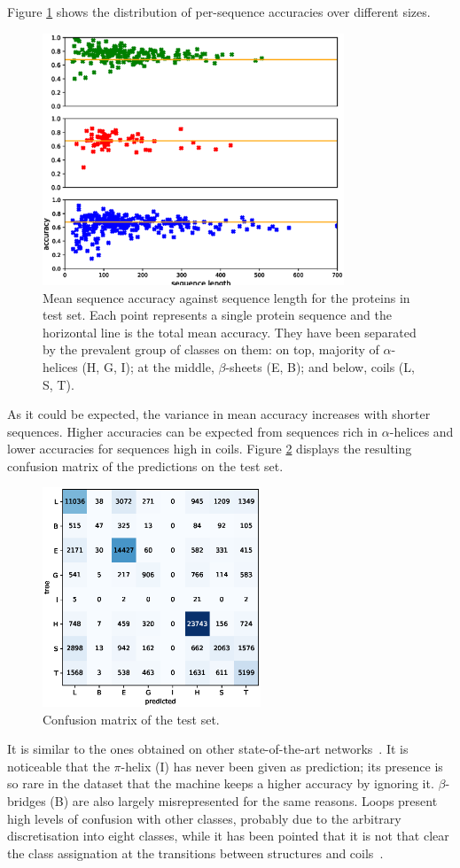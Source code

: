 \documentclass{article}
\begin{document}
Figure \ref{fig:accuracies} shows the distribution of per-sequence accuracies over different sizes.
\begin{figure}
	\centering
	\centerline{\includegraphics[width=9cm]{per_seq_acc}}
	\caption{Mean sequence accuracy against sequence length for the proteins in test set. Each point represents a single protein sequence and the horizontal line is the total mean accuracy. They have been separated by the prevalent group of classes on them: on top, majority of $\alpha$-helices (H, G, I); at the middle, $\beta$-sheets (E, B); and below, coils (L, S, T).}
	\label{fig:accuracies}
\end{figure}
As it could be expected, the variance in mean accuracy increases with shorter sequences. Higher accuracies can be expected from sequences rich in $\alpha$-helices and lower accuracies for sequences high in coils. Figure \ref{fig:confusion} displays the resulting confusion matrix of the predictions on the test set.
\begin{figure}
	\centering
	\centerline{\includegraphics[width=6.5cm]{confusion}}
	\caption{Confusion matrix of the test set.}
	\label{fig:confusion}
\end{figure}
It is similar to the ones obtained on other state-of-the-art networks~\cite{Fang2017}. It is noticeable that the $\pi$-helix (I) has never been given as prediction; its presence is so rare in the dataset that the machine keeps a higher accuracy by ignoring it. $\beta$-bridges (B) are also largely misrepresented for the same reasons. Loops present high levels of confusion with other classes, probably due to the arbitrary discretisation into eight classes, while it has been pointed that it is not that clear the class assignation at the transitions between structures and coils~\cite{Rost2001}.
\end{document}
